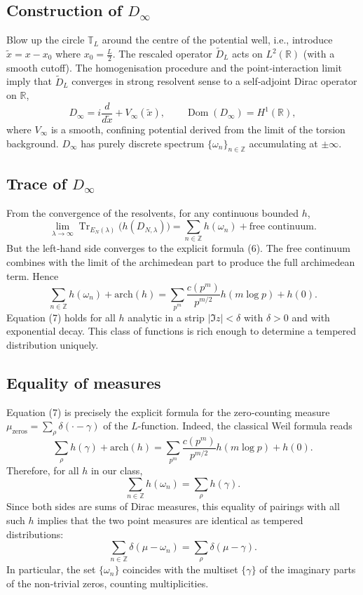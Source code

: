 \documentclass[12pt,a4paper]{article}
\newcommand{\R}{\mathbb{R}}
\newcommand{\Z}{\mathbb{Z}}
\newcommand{\T}{\mathbb{T}}
\newcommand{\tr}{\operatorname{Tr}}
\begin{document}
\subsection{Construction of $D_\infty$}
Blow up the circle $\T_L$ around the centre of the potential well, i.e., introduce $\tilde{x}=x-x_0$ where $x_0=\frac{L}{2}$.  The rescaled operator $\tilde{D}_L$ acts on $L^2(\R)$ (with a smooth cutoff).  The homogenisation procedure and the point‑interaction limit imply that $\tilde{D}_L$ converges in strong resolvent sense to a self‑adjoint Dirac operator on $\R$,
\[
D_\infty = i\frac{d}{d\tilde{x}} + V_\infty(\tilde{x}),\qquad \operatorname{Dom}(D_\infty)=H^1(\R),
\]
where $V_\infty$ is a smooth, confining potential derived from the limit of the torsion background.  $D_\infty$ has purely discrete spectrum $\{\omega_n\}_{n\in\Z}$ accumulating at $\pm\infty$.

\subsection{Trace of $D_\infty$}
From the convergence of the resolvents, for any continuous bounded $h$,
\[
\lim_{\lambda\to\infty}\tr_{E_N(\lambda)}\!\big(h(D_{N,\lambda})\big) = \sum_{n\in\Z} h(\omega_n) + \text{free continuum}.
\]
But the left‑hand side converges to the explicit formula (6).  The free continuum combines with the limit of the archimedean part to produce the full archimedean term.  Hence
\[
\sum_{n\in\Z} h(\omega_n) + \text{arch}(h) = \sum_{p^m} \frac{c(p^m)}{p^{m/2}} h(m\log p) + h(0).
\tag{7}
\]
Equation (7) holds for all $h$ analytic in a strip $|\Im z|<\delta$ with $\delta>0$ and with exponential decay.  This class of functions is rich enough to determine a tempered distribution uniquely.

\subsection{Equality of measures}
Equation (7) is precisely the explicit formula for the zero‑counting measure $\mu_{\text{zeros}} = \sum_{\rho} \delta(\cdot-\gamma)$ of the $L$-function.  Indeed, the classical Weil formula reads
\[
\sum_{\rho} h(\gamma) + \text{arch}(h) = \sum_{p^m} \frac{c(p^m)}{p^{m/2}} h(m\log p) + h(0).
\]
Therefore, for all $h$ in our class,
\[
\sum_{n\in\Z} h(\omega_n) = \sum_{\rho} h(\gamma).
\]
Since both sides are sums of Dirac measures, this equality of pairings with all such $h$ implies that the two point measures are identical as tempered distributions:
\[
\sum_{n\in\Z} \delta(\mu-\omega_n) = \sum_{\rho} \delta(\mu-\gamma).
\tag{8}
\]
In particular, the set $\{\omega_n\}$ coincides with the multiset $\{\gamma\}$ of the imaginary parts of the non‑trivial zeros, counting multiplicities.
\end{document}
